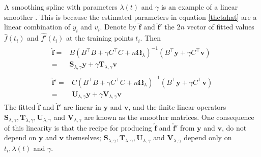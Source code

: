 A smoothing spline with parameters $\lambda(t)$ and $\gamma$ is an example of a linear smoother \citep{esl2009}. This is because the estimated parameters in equation \eqref{thetahat} are a linear combination of $y_i$ and $v_i$. Denote by $ \mathbf{\hat{f}}$ and $ \mathbf{\hat{f}'}$ the $2n$ vector of fitted values $\hat{f}(t_i)$ and $\hat{f'}(t_i)$ at the training points $t_i$. Then
\begin{align}\label{flinearST}
\begin{split}
 \mathbf{\hat{f}} =& B\left( B^\top B+\gamma C^\top C+n\mathbf{\Omega}_{\lambda}\right)^{-1}\left( B^\top\mathbf{y}+\gamma C^\top\mathbf{v}\right)\\
= & \mathbf{S}_{\lambda,\gamma}\mathbf{y}+\gamma\mathbf{T}_{\lambda,\gamma}\mathbf{v} 
\end{split}\\ \label{flinearUV}
\begin{split}
 \mathbf{\hat{f}'}
=& C\left( B^\top B+\gamma C^\top C+n\mathbf{\Omega}_{\lambda}\right)^{-1}\left( B^\top\mathbf{y}+\gamma C^\top\mathbf{v}\right)\\
=&\mathbf{U}_{\lambda,\gamma}\mathbf{y}+\gamma\mathbf{V}_{\lambda,\gamma}\mathbf{v}
\end{split}
\end{align}
The fitted $ \mathbf{\hat{f}}$ and $ \mathbf{\hat{f}'}$ are linear in $\mathbf{y}$ and $\mathbf{v}$, and the finite linear operators $\mathbf{S}_{\lambda,\gamma}, \mathbf{T}_{\lambda,\gamma}, \mathbf{U}_{\lambda,\gamma}$ and $\mathbf{V}_{\lambda,\gamma}$ are known as the smoother matrices. One consequence of this linearity is that the recipe for producing $ \mathbf{\hat{f}}$ and $ \mathbf{\hat{f}'}$ from $\mathbf{y}$ and $\mathbf{v}$, do not depend on $\mathbf{y}$ and $\mathbf{v}$ themselves; $\mathbf{S}_{\lambda,\gamma}, \mathbf{T}_{\lambda,\gamma}, \mathbf{U}_{\lambda,\gamma}$ and $\mathbf{V}_{\lambda,\gamma}$ depend only on $t_i,\lambda(t)$ and $\gamma$.

